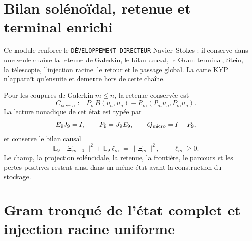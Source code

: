 \section*{Bilan solénoïdal, retenue et terminal enrichi}

Ce module renforce le \texttt{DÉVELOPPEMENT\_DIRECTEUR} Navier--Stokes : il conserve dans une seule chaîne la retenue de Galerkin, le bilan causal, le Gram terminal, Stein, la télescopie, l'injection racine, le retour et le passage global. La carte KYP n'apparaît qu'ensuite et demeure hors de cette chaîne.

Pour les coupures de Galerkin \(m\leq n\), la retenue conservée est
\begin{equation}\label{eq:amp-ns-owner-acarreo-galerkin}
 C_{m\leftarrow n}
 :=P_mB(u_n,u_n)-B_m(P_m u_n,P_m u_n).
\end{equation}
La lecture nonadique de cet état est typée par
\begin{equation}\label{eq:amp-ns-owner-e9j9}
 E_9J_9=I,\qquad P_9=J_9E_9,\qquad Q_{\rm micro}=I-P_9,
\end{equation}
et conserve le bilan causal
\begin{equation}\label{eq:amp-ns-owner-balance-causal}
 \boxed{
 \mathbb E_9\|\Xi_{m+1}\|^2+\mathbb E_9\ell_m
 =\|\Xi_m\|^2,\qquad \ell_m\geq0.}
\end{equation}
Le champ, la projection solénoïdale, la retenue, la frontière, le parcours et les pertes positives restent ainsi dans un même état avant la construction du stockage.

\section*{Gram tronqué de l'état complet et injection racine uniforme}


